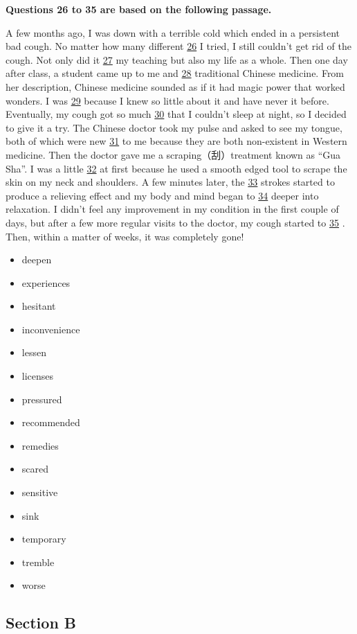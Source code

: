 \documentclass[UTF8,11pt]{ctexart}
\begin{document}
\textbf{Questions 26 to 35 are based on the following passage.}


A few months ago, I was down with a terrible cold which ended in a persistent bad cough. No matter how many different \uline{26} I tried, I still couldn’t get rid of the cough. Not only did it \uline{27} my teaching but also my life as a whole. Then one day after class, a student came up to me and \uline{28} traditional Chinese medicine. From her description, Chinese medicine sounded as if it had magic power that worked wonders. I was \uline{29} because I knew so little about it and have never it before. Eventually, my cough got so much \uline{30} that I couldn’t sleep at night, so I decided to give it a try. The Chinese doctor took my pulse and asked to see my tongue, both of which were new \uline{31} to me because they are both non-existent in Western medicine. Then the doctor gave me a scraping（刮）treatment known as “Gua Sha”. I was a little \uline{32} at first because he used a smooth edged tool to scrape the skin on my neck and shoulders. A few minutes later, the \uline{33} strokes started to produce a relieving effect and my body and mind began to \uline{34} deeper into relaxation. I didn’t feel any improvement in my condition in the first couple of days, but after a few more regular visits to the doctor, my cough started to \uline{35} . Then, within a matter of weeks, it was completely gone!


\begin{itemize}[leftmargin=2em,itemsep=.2em,topsep=.4em]\item[A.] deepen
\item[B.] experiences
\item[C.] hesitant
\item[D.] inconvenience
\item[E.] lessen
\item[F.] licenses
\item[G.] pressured
\item[H.] recommended
\item[I.] remedies
\item[J.] scared
\item[K.] sensitive
\item[L.] sink
\item[M.] temporary
\item[N.] tremble
\item[O.] worse
\end{itemize}

\subsection*{\textbf{Section B}}
\end{document}
